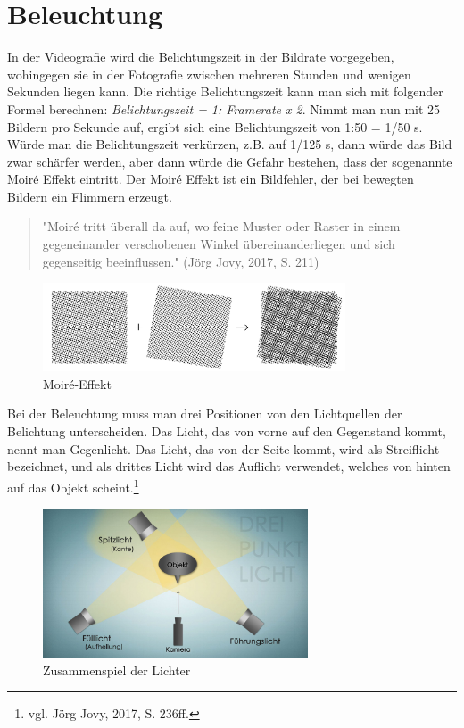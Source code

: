 \section{Beleuchtung}
In der Videografie wird die Belichtungszeit in der Bildrate vorgegeben, wohingegen sie in der Fotografie zwischen mehreren Stunden und wenigen Sekunden liegen kann.
Die richtige Belichtungszeit kann man sich mit folgender Formel berechnen: \textit{Belichtungszeit = 1: Framerate x 2}. Nimmt man nun mit 25 Bildern pro Sekunde auf, ergibt sich eine Belichtungszeit von 1:50 = 1/50 s. Würde man die Belichtungszeit verkürzen, z.B. auf 1/125 s, dann würde das Bild zwar schärfer werden, aber dann würde die Gefahr bestehen, dass der sogenannte Moir\'{e} Effekt eintritt. Der Moir\'{e} Effekt ist ein Bildfehler, der bei bewegten Bildern ein Flimmern erzeugt. \begin{quote}"Moir\'{e} tritt überall da auf, wo feine Muster oder Raster in einem gegeneinander verschobenen Winkel übereinanderliegen und sich gegenseitig beeinflussen." (Jörg Jovy, 2017, S. 211)\end{quote}
\begin{figure}[H]
	\centering
	\includegraphics[width=0.8\textwidth]{abb2} 
	\caption[Moir\'{e}-Effekt]{Moir\'{e}-Effekt\footnotemark}
\end{figure}
Bei der Beleuchtung muss man drei Positionen von den Lichtquellen der Belichtung unterscheiden. Das Licht, das von vorne auf den Gegenstand kommt, nennt man Gegenlicht. Das Licht, das von der Seite kommt, wird als Streiflicht bezeichnet, und als drittes Licht wird das Auflicht verwendet, welches von hinten auf das Objekt scheint.\footnote{\label{}vgl. Jörg Jovy, 2017, S. 236ff.}
\begin{figure}[H]
	\centering
	\includegraphics[width=0.7\textwidth]{abb3}
	\caption[Zusammenspiel der Lichter]{Zusammenspiel der Lichter\footnotemark}\label{fig:abb3}
\end{figure}
